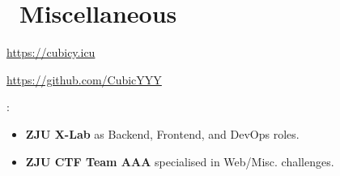 \documentclass{resume}
\begin{document}
\section{\faInfo\ Miscellaneous}
\begin{description}[parsep=0.5ex]
  \item[Personal Blog] \url{https://cubicy.icu}
  \item[GitHub] \url{https://github.com/CubicYYY}
  \item[Team Involvement] :
  \begin{itemize}
      \item \textbf{ZJU X-Lab} as Backend, Frontend, and DevOps roles.
      \item \textbf{ZJU CTF Team AAA} specialised in Web/Misc. challenges.
  \end{itemize}
\end{description}
%
%
\end{document}
